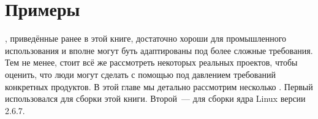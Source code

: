\chapter{Примеры }
\label{chap:example_makefiles}

, приведённые ранее в этой книге, достаточно хороши для
промышленного использования и вполне могут буть адаптированы под более
сложные требования. Тем не менее, стоит всё же рассмотреть
 некоторых реальных проектов, чтобы оценить, что люди
могут сделать с помощью \GNUmake{} под давлением требований конкретных
продуктов. В этой главе мы детально рассмотрим несколько
. Первый \Makefile{} использовался для сборки этой
книги. Второй~--- для сборки
ядра Linux версии 2.6.7.



